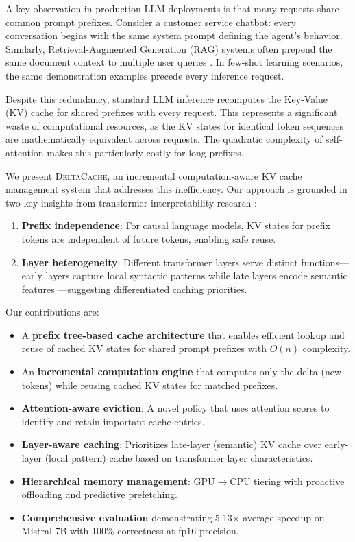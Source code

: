 \documentclass{article}
\newcommand{\deltacache}{\textsc{DeltaCache}}
\begin{document}
A key observation in production LLM deployments is that many requests share common prompt prefixes.
Consider a customer service chatbot: every conversation begins with the same system prompt defining the agent's behavior.
Similarly, Retrieval-Augmented Generation (RAG) systems often prepend the same document context to multiple user queries \citep{lewis2020retrieval}.
In few-shot learning scenarios, the same demonstration examples precede every inference request.

Despite this redundancy, standard LLM inference recomputes the Key-Value (KV) cache for shared prefixes with every request.
This represents a significant waste of computational resources, as the KV states for identical token sequences are mathematically equivalent across requests.
The quadratic complexity of self-attention makes this particularly costly for long prefixes.

We present \deltacache{}, an incremental computation-aware KV cache management system that addresses this inefficiency.
Our approach is grounded in two key insights from transformer interpretability research \citep{rogers2020primer,elhage2021mathematical}:

\begin{enumerate}
    \item \textbf{Prefix independence}: For causal language models, KV states for prefix tokens are independent of future tokens, enabling safe reuse.
    \item \textbf{Layer heterogeneity}: Different transformer layers serve distinct functions---early layers capture local syntactic patterns while late layers encode semantic features \citep{geva2023dissecting}---suggesting differentiated caching priorities.
\end{enumerate}

Our contributions are:
\begin{itemize}
    \item A \textbf{prefix tree-based cache architecture} that enables efficient lookup and reuse of cached KV states for shared prompt prefixes with $O(n)$ complexity.
    \item An \textbf{incremental computation engine} that computes only the delta (new tokens) while reusing cached KV states for matched prefixes.
    \item \textbf{Attention-aware eviction}: A novel policy that uses attention scores to identify and retain important cache entries.
    \item \textbf{Layer-aware caching}: Prioritizes late-layer (semantic) KV cache over early-layer (local pattern) cache based on transformer layer characteristics.
    \item \textbf{Hierarchical memory management}: GPU$\rightarrow$CPU tiering with proactive offloading and predictive prefetching.
    \item \textbf{Comprehensive evaluation} demonstrating 5.13$\times$ average speedup on Mistral-7B with 100\% correctness at fp16 precision.
\end{itemize}
\end{document}
